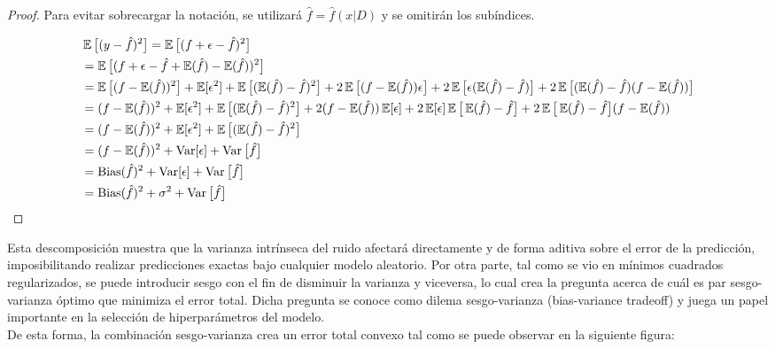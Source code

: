 \begin{proof}

Para evitar sobrecargar la notación, se utilizará $\hat{f}=\hat{f}(x|D)$ y se omitirán los subíndices.

\begin{align*}
&\operatorname{\mathbb{E}}\big[(y - \hat{f})^2\big] = \operatorname{\mathbb{E}}\big[(f+\epsilon  - \hat{f} )^2\big] \\
 & = \operatorname{\mathbb{E}}\big[(f+\epsilon  - \hat{f} +\operatorname{\mathbb{E}}(\hat{f})-\operatorname{\mathbb{E}}(\hat{f}))^2\big] \\
 & = \operatorname{\mathbb{E}}\big[(f-\operatorname{\mathbb{E}}(\hat{f}))^2\big]+\operatorname{\mathbb{E}}[\epsilon^2]+\operatorname{\mathbb{E}}\big[(\operatorname{\mathbb{E}}(\hat{f})- \hat{f})^2\big] 
+2\operatorname{\mathbb{E}}\big[(f-\operatorname{\mathbb{E}}(\hat{f}))\epsilon\big]
+2\operatorname{\mathbb{E}}\big[\epsilon(\operatorname{\mathbb{E}}(\hat{f})- \hat{f})\big]
+2\operatorname{\mathbb{E}}\big[(\operatorname{\mathbb{E}}(\hat{f})- \hat{f})(f-\operatorname{\mathbb{E}}(\hat{f}))\big] \\
 & = (f-\operatorname{\mathbb{E}}(\hat{f}))^2+\operatorname{\mathbb{E}}[\epsilon^2]+\operatorname{\mathbb{E}}\big[(\operatorname{\mathbb{E}}(\hat{f})- \hat{f})^2\big] 
+2(f-\operatorname{\mathbb{E}}(\hat{f}))\operatorname{\mathbb{E}}[\epsilon]
+2\operatorname{\mathbb{E}}[\epsilon]\operatorname{\mathbb{E}}\big[\operatorname{\mathbb{E}}(\hat{f})- \hat{f}\big]
+2\operatorname{\mathbb{E}}\big[\operatorname{\mathbb{E}}(\hat{f})- \hat{f}\big](f-\operatorname{\mathbb{E}}(\hat{f})) \\
 & = (f-\operatorname{\mathbb{E}}(\hat{f}))^2+\operatorname{\mathbb{E}}[\epsilon^2]+\operatorname{\mathbb{E}}\big[(\operatorname{\mathbb{E}}(\hat{f})- \hat{f})^2\big]\\
 & = (f-\operatorname{\mathbb{E}}(\hat{f}))^2+\operatorname{Var}[\epsilon]+\operatorname{Var}\big[\hat{f}\big]\\
 & = \operatorname{Bias}(\hat{f})^2+\operatorname{Var}[\epsilon]+\operatorname{Var}\big[\hat{f}\big]\\
 & = \operatorname{Bias}(\hat{f})^2+\sigma^2+\operatorname{Var}\big[\hat{f}\big]
\end{align*}
\end{proof}

Esta descomposición muestra que la varianza intrínseca del ruido afectará directamente y de forma aditiva sobre el error de la predicción, imposibilitando realizar predicciones exactas bajo cualquier modelo aleatorio. Por otra parte, tal como se vio en mínimos cuadrados regularizados, se puede introducir sesgo con el fin de disminuir la varianza y viceversa, lo cual crea la pregunta acerca de cuál es par sesgo-varianza óptimo que minimiza el error total. Dicha pregunta se conoce como dilema sesgo-varianza (bias-variance tradeoff) y juega un papel importante en la selección de hiperparámetros del modelo.\\

De esta forma, la combinación sesgo-varianza crea un error total convexo tal como se puede observar en la siguiente figura:


